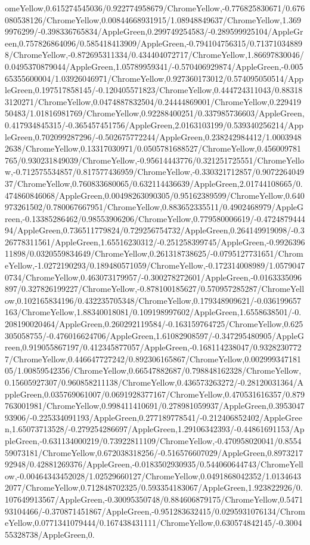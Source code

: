 {\begin{tikzternal}
omeYellow,0.615274545036/0.922774958679/ChromeYellow,-0.776825830671/0.676080538126/ChromeYellow,0.00844668931915/1.08948849637/ChromeYellow,1.3699976299/-0.398336765834/AppleGreen,0.299749254583/-0.289599925104/AppleGreen,0.757826864096/0.585418413909/AppleGreen,-0.794104756315/0.713710348898/ChromeYellow,-0.872695311334/0.434404072717/ChromeYellow,1.86697830046/0.0495370879044/AppleGreen,1.05789959341/-0.570406929874/AppleGreen,-0.00565355600004/1.03926046971/ChromeYellow,0.927360173012/0.574095050514/AppleGreen,0.197517858145/-0.120405571823/ChromeYellow,0.444724311043/0.883183120271/ChromeYellow,0.0474887832504/0.24444869001/ChromeYellow,0.22941950483/1.01816981769/ChromeYellow,0.92288400251/0.337985736603/AppleGreen,0.417934845315/-0.365457451756/AppleGreen,2.0163103199/0.539340256214/AppleGreen,0.702099287296/-0.502675772244/AppleGreen,0.238242984412/1.00039482638/ChromeYellow,0.13317030971/0.0505781688527/ChromeYellow,0.456009781765/0.930231849039/ChromeYellow,-0.95614443776/0.321251725551/ChromeYellow,-0.712575534857/0.817577436959/ChromeYellow,-0.330321712857/0.907226404937/ChromeYellow,0.760833680065/0.632114436639/AppleGreen,2.01744108665/0.474860846068/AppleGreen,0.00498263090305/0.95162389599/ChromeYellow,0.640973261502/0.780067667951/ChromeYellow,0.883652335511/0.4902468979/AppleGreen,-0.13385286462/0.98553906206/ChromeYellow,0.779580006619/-0.472487944494/AppleGreen,0.736511779824/0.729256754732/AppleGreen,0.264149919098/-0.326778311561/AppleGreen,1.65516230312/-0.251258399745/AppleGreen,-0.992639611898/0.0320559834649/ChromeYellow,0.261318738625/-0.0795127731651/ChromeYellow,-1.0272190293/0.189480571059/ChromeYellow,-0.172314008989/1.05790470734/ChromeYellow,0.463073179957/-0.300278272601/AppleGreen,-0.0163335096897/0.327826199227/ChromeYellow,-0.878100185627/0.570957285287/ChromeYellow,0.102165834196/0.432235705348/ChromeYellow,0.179348909621/-0.036199657163/ChromeYellow,1.88340018081/0.109198997602/AppleGreen,1.6558638501/-0.208190020464/AppleGreen,0.260292119584/-0.163159764725/ChromeYellow,0.625305058755/-0.476016624706/AppleGreen,1.61082908597/-0.347295480905/AppleGreen,0.919055867197/0.412345877057/AppleGreen,-0.168114238047/0.93282307727/ChromeYellow,0.446647727242/0.892306165867/ChromeYellow,0.00299934718105/1.00859542356/ChromeYellow,0.66547882687/0.798848162328/ChromeYellow,0.15605927307/0.960858211138/ChromeYellow,0.436573263272/-0.28120031364/AppleGreen,0.035769061007/0.0691928377167/ChromeYellow,0.470531616357/0.879763001981/ChromeYellow,0.998411410691/0.278981059937/AppleGreen,0.395304793906/-0.225334091193/AppleGreen,0.277189778541/-0.212406852402/AppleGreen,1.65073713528/-0.279254286697/AppleGreen,1.29106342393/-0.44861691153/AppleGreen,-0.631134000219/0.73922811109/ChromeYellow,-0.470958020041/0.855459073181/ChromeYellow,0.672038318256/-0.516576607029/AppleGreen,0.897321792948/0.42881269376/AppleGreen,-0.0183502930935/0.544060644743/ChromeYellow,-0.00464343452028/1.02529660127/ChromeYellow,0.0491868042352/1.01346432077/ChromeYellow,0.712848702325/0.593354183067/AppleGreen,1.923822926/0.107649913567/AppleGreen,-0.30095350748/0.884606879175/ChromeYellow,0.547193104466/-0.370871451867/AppleGreen,-0.951283632415/0.0295931076134/ChromeYellow,0.0771341079444/0.167438431111/ChromeYellow,0.630574842145/-0.300455328738/AppleGreen,0.
\end{tikzternal}}
